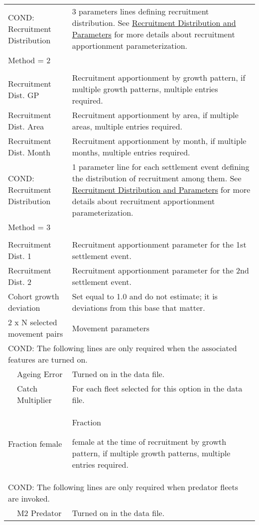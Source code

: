 \begin{longtable}{p{1cm} p{2.25cm} p{10cm}}
	\multicolumn{2}{l}{COND: Recruitment Distribution } \Tstrut & 3 parameters lines defining recruitment distribution. See \hyperlink{recdist}{Recruitment Distribution and Parameters} for more details about recruitment apportionment parameterization. \\
	\multicolumn{2}{l}{ Method = 2 } \Tstrut & \\
	& & \\
	\multicolumn{2}{l}{Recruitment Dist. GP} \Tstrut & Recruitment apportionment by growth pattern, if multiple growth patterns, multiple entries required.\\
	\multicolumn{2}{l}{Recruitment Dist. Area} & Recruitment apportionment by area, if multiple areas, multiple entries required.\\
	\multicolumn{2}{l}{Recruitment Dist. Month} & Recruitment apportionment by month, if multiple months, multiple entries required.\Bstrut\\
	\hline

	\multicolumn{2}{l}{COND: Recruitment Distribution } \Tstrut & 1 parameter line for each settlement event defining the distribution of recruitment among them. See \hyperlink{recdist}{Recruitment Distribution and Parameters} for more details about recruitment apportionment parameterization. \\
	\multicolumn{2}{l}{ Method = 3 } \Tstrut & \\
	& & \\
	\multicolumn{2}{l}{Recruitment Dist. 1} \Tstrut & Recruitment apportionment parameter for the 1st settlement event.\\
	\multicolumn{2}{l}{Recruitment Dist. 2} & Recruitment apportionment parameter for the 2nd settlement event.\Bstrut\\
	\hline

	\multicolumn{2}{l}{Cohort growth deviation} \Tstrut & Set equal to 1.0 and do not estimate; it is deviations from this base that matter.\Bstrut\\
	\hline

	\multicolumn{2}{l}{2 x N selected movement pairs} & Movement parameters\Tstrut\Bstrut\\
	\hline

	\multicolumn{3}{l}{COND: The following lines are only required when the associated features are turned on.}\Tstrut\\
	& Ageing Error & Turned on in the data file.\\
	& Catch Multiplier & For each fleet selected for this option in the data file.\\
	\hline

	\multicolumn{2}{l}{Fraction female}\Tstrut & \hypertarget{SexRatio}{Fraction} female at the time of recruitment by growth pattern, if multiple growth patterns, multiple entries required.\Bstrut\\
	\hline
	
	\multicolumn{3}{l}{COND: The following lines are only required when predator fleets are invoked.}\Tstrut\\
	& M2 Predator & Turned on in the data file.\\
	\hline
\end{longtable}


